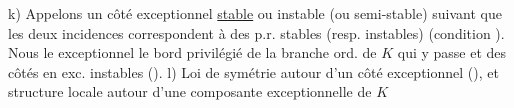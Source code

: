 k) Appelons un côté exceptionnel \uline{stable} ou instable (ou semi-stable) suivant que les deux   incidences correspondent à des p.r. stables (resp. instables) (condition   ). Nous  le  exceptionnel le bord privilégié de la branche ord. de \(K\) qui y passe et des côtés en  exc. instables ().
l) Loi de symétrie autour d'un côté exceptionnel (), et structure locale autour d'une composante exceptionnelle de \(K\)

